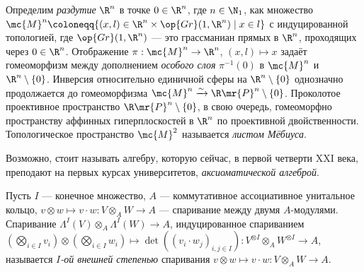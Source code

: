 \documentclass[
	extrafontsizes,
	11pt,
	hyphens,
]{memoir}
\begin{document}
\begin{observation}
Определим \emph{раздутие} \(\R^n\) в точке \(0 \in \R^n\), где \(n \in \N_1\),
как множество
\(\mc{M}^n \coloneqq \{(x,l) \in \R^n \times \op{Gr}(1,\R^n) \mid x \in l\}\) с индуцированной топологией,
где
\(\op{Gr}(1,\R^n)\) --- это грассманиан прямых в \(\R^n\), проходящих через \(0 \in \R^n\).
Отображение
\(\pi: \mc{M}^n \to \R^n\), \((x,l) \mapsto x\)
задаёт гомеоморфизм между дополнением \emph{особого слоя} \(\pi^{-1}(0)\) в \(\mc{M}^n\) и \(\R^n \setminus \{0\}\).
Инверсия относительно единичной сферы на \(\R^n \setminus \{0\}\) однозначно продолжается до гомеоморфизма \(\mc{M}^n \xrightarrow{\sim} \R\mr{P}^n \setminus \{0\}\).
Проколотое проективное пространство  \(\R\mr{P}^n \setminus \{0\}\), в свою очередь, гомеоморфно пространству аффинных гиперплоскостей в \(\R^n\) по проективной двойственности.
Топологическое пространство \(\mc{M}^2\) называется \emph{листом Мёбиуса}.
\end{observation}


\begin{convention}
Возможно, стоит называть алгебру, которую сейчас, в первой четверти XXI века, преподают на первых курсах университетов, \emph{аксиоматической алгеброй}.
\end{convention}

\begin{definition}
\label{def:ExterPairSq}
Пусть \(I\) --- конечное множество, \(A\) --- коммутативное ассоциативное унитальное кольцо, \(v \otimes w \mapsto v \cdot w : V \otimes_A W \to A\) --- спаривание между двумя \(A\)-мо\-ду\-ля\-ми.
Спаривание \(\Lambda^I (V) \otimes_A \Lambda^I (W) \to A\), индуцированное спариванием \((\bigotimes_{i \in I} v_i) \otimes (\bigotimes_{i \in I} w_i) \mapsto \det((v_i \cdot w_j)_{i,j \in I}) : V^{\otimes I} \otimes_A W^{\otimes I} \to A\), называется \emph{\(I\)-ой внешней степенью} спаривания \(v \otimes w \mapsto v \cdot w : V \otimes_A W \to A\).
\end{definition}
\end{document}
